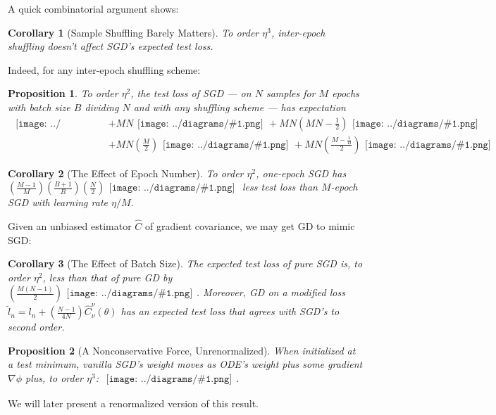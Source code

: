 \documentclass{article}
\newtheorem{cor}{Corollary}
\newtheorem{prop}{Proposition}
\newcommand{\wrap}[1]{\left(#1\right)}
\newcommand{\mdia}[1]{\begin{gathered}\texttt{[image: ../diagrams/\#1.png]}\end{gathered}}
\newcommand{\sdia}[1]{\begin{gathered}\texttt{[image: ../diagrams/\#1.png]}\end{gathered}}
\begin{document}
        A quick combinatorial argument shows:
        \begin{cor}[Sample Shuffling Barely Matters] \label{cor:shuffle}
            To order $\eta^3$, inter-epoch shuffling doesn't affect SGD's
            expected test loss.
        \end{cor}
        Indeed, for any inter-epoch shuffling scheme: 
        \begin{prop}\label{prop:ordtwo}
            To order $\eta^2$, the test loss of SGD --- on $N$
            samples for $M$ epochs with batch size $B$ dividing $N$ and with any
            shuffling scheme --- has expectation
            {\small
            \begin{align*}
                                                        \mdia{(0)()}
                &+ MN                                   \mdia{(0-1)(01)}
                 + MN\wrap{MN - \frac{1}{2}}            \mdia{(0-1-2)(01-12)} \\
                &+ MN\wrap{\frac{M}{2}}                 \mdia{c(01-2)(02-12)}  
                 + MN\wrap{\frac{M-\frac{1}{B}}{2}}     \mdia{c(01-2)(01-12)}
            \end{align*}
            }
        \end{prop}
    
        \begin{cor}[The Effect of Epoch Number] \label{cor:epochs}
            To order $\eta^2$, one-epoch SGD has 
            $
                 \wrap{\frac{M-1}{M}}\wrap{\frac{B+1}{B}}\wrap{\frac{N}{2}} \sdia{c(01-2)(01-12)}
            $
            less test loss than $M$-epoch SGD with learning rate $\eta/M$. 
        \end{cor}
    
        Given an unbiased estimator $\hat{C}$ of gradient covariance, we may get
        GD to mimic SGD:
        \begin{cor}[The Effect of Batch Size] \label{cor:batch}
            The expected test loss of pure SGD is, to order $\eta^2$,
            less than that of pure GD by
            $
                  \wrap{\frac{M(N-1)}{2}} \sdia{c(01-2)(01-12)}
            $.
            Moreover, GD on a modified loss 
            $
                \tilde l_n = l_n + \wrap{\frac{N-1}{4N}} \hat{C}_\nu^\nu(\theta)
            $
            has an expected test loss that agrees with SGD's to second order.
        \end{cor}
    
        \begin{prop}[A Nonconservative Force, Unrenormalized] \label{cor:noncons}
            When initialized at a test minimum, vanilla SGD's weight moves as ODE's
            weight plus some gradient $\nabla\phi$ plus, to order $\eta^3$: 
            $
                \sdia{c(01-2-3)(02-12-23)}
            $.
        \end{prop}
        We will later present a renormalized version of this result.
    
\end{document}
